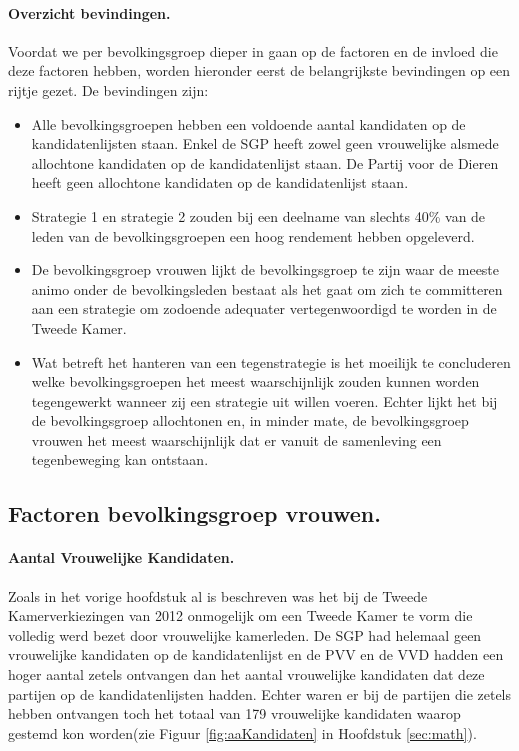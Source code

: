\paragraph{Overzicht bevindingen.}
Voordat we per bevolkingsgroep dieper in gaan op de factoren en de invloed die deze factoren hebben, worden hieronder eerst de belangrijkste bevindingen op een rijtje gezet. De bevindingen zijn:

\begin{itemize}
\item
Alle bevolkingsgroepen hebben een voldoende aantal kandidaten op de kandidatenlijsten staan. Enkel de SGP heeft zowel geen vrouwelijke alsmede allochtone kandidaten op de kandidatenlijst staan. De Partij voor de Dieren heeft geen allochtone kandidaten op de kandidatenlijst staan.
\item
Strategie 1 en strategie 2 zouden bij een deelname van slechts 40\% van de leden van de bevolkingsgroepen een hoog rendement hebben opgeleverd.
\item
De bevolkingsgroep vrouwen lijkt de bevolkingsgroep te zijn waar de meeste animo onder de bevolkingsleden bestaat als het gaat om zich te committeren aan een strategie om zodoende adequater vertegenwoordigd te worden in de Tweede Kamer. 

\item
Wat betreft het hanteren van een tegenstrategie is het moeilijk te concluderen welke bevolkingsgroepen het meest waarschijnlijk zouden kunnen worden tegengewerkt wanneer zij een strategie uit willen voeren. Echter lijkt het bij de bevolkingsgroep allochtonen en, in minder mate,  de bevolkingsgroep vrouwen het meest waarschijnlijk dat er vanuit de samenleving een tegenbeweging kan ontstaan.


\end{itemize}



\subsection{Factoren bevolkingsgroep vrouwen.}
\label{percV}

\paragraph{Aantal Vrouwelijke Kandidaten.}
Zoals in het vorige hoofdstuk al is beschreven was het bij de Tweede Kamerverkiezingen van 2012 onmogelijk om een Tweede Kamer te vorm die volledig werd bezet door vrouwelijke kamerleden. De SGP had helemaal geen vrouwelijke kandidaten op de kandidatenlijst en de PVV en de VVD hadden een hoger aantal zetels ontvangen dan het aantal vrouwelijke kandidaten dat deze partijen op de kandidatenlijsten hadden. Echter waren er bij de partijen die zetels hebben ontvangen toch het totaal van 179 vrouwelijke kandidaten waarop gestemd kon worden(zie Figuur \ref{fig:aaKandidaten} in Hoofdstuk  \ref{sec:math}). 


